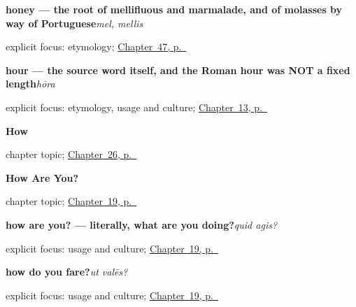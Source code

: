 \noindent\begin{minipage}[t]{\linewidth}
\raggedright
\textbf{honey — the root of mellifluous and marmalade, and of molasses by way of Portuguese}\enspace\emph{mel, mellis}\par
\footnotesize explicit focus: etymology; \hyperref[ch:la-mensa]{Chapter~47, p.~\pageref*{ch:la-mensa}}
\end{minipage}\par\smallskip

\noindent\begin{minipage}[t]{\linewidth}
\raggedright
\textbf{hour — the source word itself, and the Roman hour was NOT a fixed length}\enspace\emph{hōra}\par
\footnotesize explicit focus: etymology, usage and culture; \hyperref[ch:la-telling-time]{Chapter~13, p.~\pageref*{ch:la-telling-time}}
\end{minipage}\par\smallskip

\noindent\begin{minipage}[t]{\linewidth}
\raggedright
\textbf{How}\par
\footnotesize chapter topic; \hyperref[ch:la-how]{Chapter~26, p.~\pageref*{ch:la-how}}
\end{minipage}\par\smallskip

\noindent\begin{minipage}[t]{\linewidth}
\raggedright
\textbf{How Are You?}\par
\footnotesize chapter topic; \hyperref[ch:la-how-are-you]{Chapter~19, p.~\pageref*{ch:la-how-are-you}}
\end{minipage}\par\smallskip

\noindent\begin{minipage}[t]{\linewidth}
\raggedright
\textbf{how are you? — literally, what are you doing?}\enspace\emph{quid agis?}\par
\footnotesize explicit focus: usage and culture; \hyperref[ch:la-how-are-you]{Chapter~19, p.~\pageref*{ch:la-how-are-you}}
\end{minipage}\par\smallskip

\noindent\begin{minipage}[t]{\linewidth}
\raggedright
\textbf{how do you fare?}\enspace\emph{ut valēs?}\par
\footnotesize explicit focus: usage and culture; \hyperref[ch:la-how-are-you]{Chapter~19, p.~\pageref*{ch:la-how-are-you}}
\end{minipage}\par\smallskip

